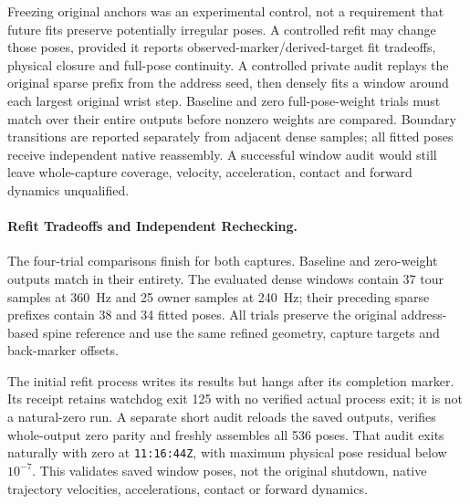 \documentclass[11pt,a4paper]{article}
\begin{document}
Freezing original anchors was an experimental control, not a requirement
that future fits preserve potentially irregular poses. A controlled refit
may change those poses, provided it reports observed-marker/derived-target
fit tradeoffs, physical closure and full-pose continuity. A controlled private
audit replays the original sparse prefix from the address seed, then densely
fits a window around each largest original wrist step. Baseline and zero
full-pose-weight trials must match over their entire outputs before nonzero
weights are compared. Boundary transitions are reported separately from
adjacent dense samples; all fitted poses receive independent native
reassembly. A successful window audit would still leave whole-capture
coverage, velocity, acceleration, contact and forward dynamics unqualified.

\paragraph{Refit Tradeoffs and Independent Rechecking.}
The four-trial comparisons finish for both captures. Baseline and zero-weight
outputs match in their entirety. The evaluated dense windows contain 37
tour samples at 360~Hz and 25 owner samples at 240~Hz; their preceding
sparse prefixes contain 38 and 34 fitted poses. All trials preserve the
original address-based spine reference and use the same refined geometry,
capture targets and back-marker offsets.

The initial refit process writes its results but hangs after its completion
marker. Its receipt retains watchdog exit 125 with no verified actual
process exit; it is not a natural-zero run. A separate short audit reloads
the saved outputs, verifies whole-output zero parity and freshly assembles
all 536 poses. That audit exits naturally with zero at
\texttt{11:16:44Z}, with maximum physical pose residual below
\(10^{-7}\). This validates saved window poses, not the original shutdown,
native trajectory velocities, accelerations, contact or forward dynamics.
\end{document}
